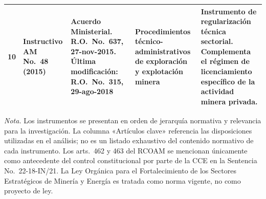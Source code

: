 \begin{longtable}{|p{}|p{}|p{}|p{}|p{}|}
10 &
Instructivo AM No.\ 48 (2015) &
Acuerdo Ministerial. R.O.\ No.\ 637, 27-nov-2015. Última modificación: R.O.\ No.\ 315, 29-ago-2018 &
Procedimientos técnico-administrativos de exploración y explotación minera &
Instrumento de regularización técnica sectorial. Complementa el régimen de licenciamiento específico de la actividad minera privada. \\
\hline

\end{longtable}
\endgroup

\noindent\textit{Nota.} Los instrumentos se presentan en orden de jerarquía normativa y relevancia para la investigación. La columna «Artículos clave» referencia las disposiciones utilizadas en el análisis; no es un listado exhaustivo del contenido normativo de cada instrumento. Los arts.\ 462 y 463 del RCOAM se mencionan únicamente como antecedente del control constitucional por parte de la CCE en la Sentencia No.\ 22-18-IN/21. La Ley Orgánica para el Fortalecimiento de los Sectores Estratégicos de Minería y Energía es tratada como norma vigente, no como proyecto de ley.
